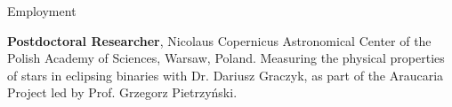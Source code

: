 \begin{rubric}{Employment}

\entry*[Jan. 2023 -- ~~]%
    \textbf{Postdoctoral Researcher}, Nicolaus Copernicus Astronomical Center of the Polish Academy of Sciences, Warsaw, Poland. Measuring the physical properties of stars in eclipsing binaries with Dr. Dariusz Graczyk, as part of the Araucaria Project led by Prof. Grzegorz Pietrzy\'{n}ski. 

    
\end{rubric}